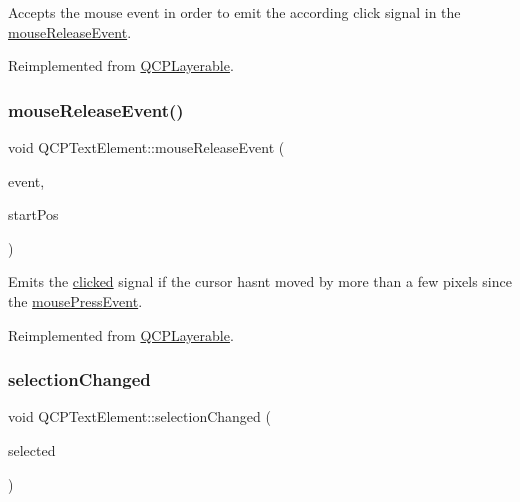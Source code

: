 Accepts the mouse event in order to emit the according click signal in the \hyperlink{class_q_c_p_text_element_acfcbaf9b1da18745e72726aafb39c855}{mouse\+Release\+Event}.

Reimplemented from \hyperlink{class_q_c_p_layerable_af6567604818db90f4fd52822f8bc8376}{Q\+C\+P\+Layerable}.

\mbox{\label{class_q_c_p_text_element_acfcbaf9b1da18745e72726aafb39c855}} 
\subsubsection{\texorpdfstring{mouse\+Release\+Event()}{mouseReleaseEvent()}}
{\footnotesize\ttfamily void Q\+C\+P\+Text\+Element\+::mouse\+Release\+Event (\begin{DoxyParamCaption}\item[{Q\+Mouse\+Event $\ast$}]{event,  }\item[{const Q\+PointF \&}]{start\+Pos }\end{DoxyParamCaption})\hspace{0.3cm}{\ttfamily [virtual]}}

Emits the \hyperlink{class_q_c_p_text_element_ad2246a0e701c0655623f048737298334}{clicked} signal if the cursor hasn\textquotesingle{}t moved by more than a few pixels since the \hyperlink{class_q_c_p_text_element_ad7b2c98355e3d2f912574b74fcee0574}{mouse\+Press\+Event}.

Reimplemented from \hyperlink{class_q_c_p_layerable_aa0d79b005686f668622bbe66ac03ba2c}{Q\+C\+P\+Layerable}.

\mbox{\label{class_q_c_p_text_element_a49f45b87ee9c1fe866c2cdd12af17a9a}} 
\subsubsection{\texorpdfstring{selection\+Changed}{selectionChanged}}
{\footnotesize\ttfamily void Q\+C\+P\+Text\+Element\+::selection\+Changed (\begin{DoxyParamCaption}\item[{bool}]{selected }\end{DoxyParamCaption})\hspace{0.3cm}{\ttfamily [signal]}}

